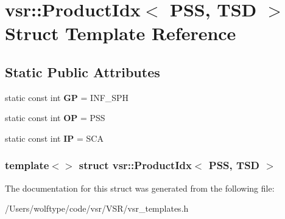\hypertarget{structvsr_1_1_product_idx_3_01_p_s_s_00_01_t_s_d_01_4}{\section{vsr\-:\-:Product\-Idx$<$ P\-S\-S, T\-S\-D $>$ Struct Template Reference}
\label{structvsr_1_1_product_idx_3_01_p_s_s_00_01_t_s_d_01_4}
}
\subsection*{Static Public Attributes}
\begin{DoxyCompactItemize}
\item 
\hypertarget{structvsr_1_1_product_idx_3_01_p_s_s_00_01_t_s_d_01_4_a6cbe3512cee143eed40c1f3951a69355}{static const int {\bfseries G\-P} = I\-N\-F\-\_\-\-S\-P\-H}\label{structvsr_1_1_product_idx_3_01_p_s_s_00_01_t_s_d_01_4_a6cbe3512cee143eed40c1f3951a69355}

\item 
\hypertarget{structvsr_1_1_product_idx_3_01_p_s_s_00_01_t_s_d_01_4_a7765bf632ce6b01e500284f79121cd6f}{static const int {\bfseries O\-P} = P\-S\-S}\label{structvsr_1_1_product_idx_3_01_p_s_s_00_01_t_s_d_01_4_a7765bf632ce6b01e500284f79121cd6f}

\item 
\hypertarget{structvsr_1_1_product_idx_3_01_p_s_s_00_01_t_s_d_01_4_a86eb81b73ae51dbe04e16a532d375db3}{static const int {\bfseries I\-P} = S\-C\-A}\label{structvsr_1_1_product_idx_3_01_p_s_s_00_01_t_s_d_01_4_a86eb81b73ae51dbe04e16a532d375db3}

\end{DoxyCompactItemize}
\subsubsection*{template$<$$>$ struct vsr\-::\-Product\-Idx$<$ P\-S\-S, T\-S\-D $>$}



The documentation for this struct was generated from the following file\-:\begin{DoxyCompactItemize}
\item 
/\-Users/wolftype/code/vsr/\-V\-S\-R/vsr\-\_\-templates.\-h\end{DoxyCompactItemize}
